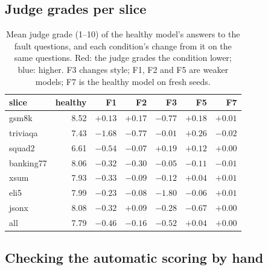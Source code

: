 \documentclass{article}
\begin{document}
\subsection{Judge grades per slice}
\label{app:judge}
\begin{table}[h]
  \centering\small
  \caption{Mean judge grade (1--10) of the healthy model's answers to the fault
  questions, and each condition's change from it on the same questions. Red: the
  judge grades the condition lower; blue: higher. F3 changes style; F1, F2 and F5
  are weaker models; F7 is the healthy model on fresh seeds.}
  \begin{tabular}{lrrrrrr}
    \toprule
    slice & healthy & F1 & F2 & F3 & F5 & F7 \\
    \midrule
    \textsf{gsm8k} & 8.52 & \cellcolor{blue!4}$+0.13$ & \cellcolor{blue!6}$+0.17$ & \cellcolor{red!26}$-0.77$ & \cellcolor{blue!6}$+0.18$ & $+0.01$ \\
    \textsf{triviaqa} & 7.43 & \cellcolor{red!56}$-1.68$ & \cellcolor{red!26}$-0.77$ & $-0.01$ & \cellcolor{blue!9}$+0.26$ & $-0.02$ \\
    \textsf{squad2} & 6.61 & \cellcolor{red!18}$-0.54$ & $-0.07$ & \cellcolor{blue!6}$+0.19$ & \cellcolor{blue!4}$+0.12$ & $+0.00$ \\
    \textsf{banking77} & 8.06 & \cellcolor{red!11}$-0.32$ & \cellcolor{red!10}$-0.30$ & $-0.05$ & \cellcolor{red!4}$-0.11$ & $-0.01$ \\
    \textsf{xsum} & 7.93 & \cellcolor{red!11}$-0.33$ & \cellcolor{red!3}$-0.09$ & \cellcolor{red!4}$-0.12$ & $+0.04$ & $+0.01$ \\
    \textsf{eli5} & 7.99 & \cellcolor{red!8}$-0.23$ & \cellcolor{red!3}$-0.08$ & \cellcolor{red!60}$-1.80$ & $-0.06$ & $+0.01$ \\
    \textsf{jsonx} & 8.08 & \cellcolor{red!11}$-0.32$ & \cellcolor{blue!3}$+0.09$ & \cellcolor{red!9}$-0.28$ & \cellcolor{red!22}$-0.67$ & $+0.00$ \\
    \midrule
    all & 7.79 & \cellcolor{red!15}$-0.46$ & \cellcolor{red!5}$-0.16$ & \cellcolor{red!17}$-0.52$ & $+0.04$ & $+0.00$ \\
    \bottomrule
  \end{tabular}
\end{table}

\subsection{Checking the automatic scoring by hand}
\label{app:hand}
\end{document}
